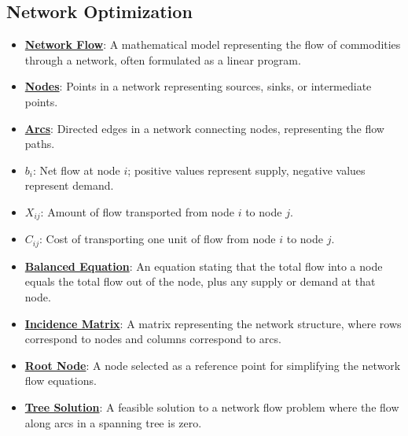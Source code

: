 \documentclass{article}%
\begin{document}
\subsection{Network Optimization}%
\label{subsec:NetworkOptimization}%
\begin{itemize}[leftmargin=*]%
\item \href{https://www.math.purdue.edu/~yipn/421//2024-11-05-NetFlows.pdf#page=1}{\textbf{Network Flow}}: A mathematical model representing the flow of commodities through a network, often formulated as a linear program.%
\item \href{https://www.math.purdue.edu/~yipn/421//2024-11-05-NetFlows.pdf#page=1}{\textbf{Nodes}}: Points in a network representing sources, sinks, or intermediate points.%
\item \href{https://www.math.purdue.edu/~yipn/421//2024-11-05-NetFlows.pdf#page=1}{\textbf{Arcs}}: Directed edges in a network connecting nodes, representing the flow paths.%
\item \href{https://www.math.purdue.edu/~yipn/421//2024-11-05-NetFlows.pdf#page=2}{\textbf{$b_i$}}: Net flow at node $i$; positive values represent supply, negative values represent demand.%
\item \href{https://www.math.purdue.edu/~yipn/421//2024-11-05-NetFlows.pdf#page=2}{\textbf{$X_{ij}$}}: Amount of flow transported from node $i$ to node $j$.%
\item \href{https://www.math.purdue.edu/~yipn/421//2024-11-05-NetFlows.pdf#page=2}{\textbf{$C_{ij}$}}: Cost of transporting one unit of flow from node $i$ to node $j$.%
\item \href{https://www.math.purdue.edu/~yipn/421//2024-11-05-NetFlows.pdf#page=3}{\textbf{Balanced Equation}}: An equation stating that the total flow into a node equals the total flow out of the node, plus any supply or demand at that node.%
\item \href{https://www.math.purdue.edu/~yipn/421//2024-11-05-NetFlows.pdf#page=4}{\textbf{Incidence Matrix}}: A matrix representing the network structure, where rows correspond to nodes and columns correspond to arcs.%
\item \href{https://www.math.purdue.edu/~yipn/421//2024-11-05-NetFlows.pdf#page=6}{\textbf{Root Node}}: A node selected as a reference point for simplifying the network flow equations.%
\item \href{https://www.math.purdue.edu/~yipn/421//2024-11-05-NetFlows.pdf#page=11}{\textbf{Tree Solution}}: A feasible solution to a network flow problem where the flow along arcs in a spanning tree is zero.%

\end{itemize}
\end{document}
